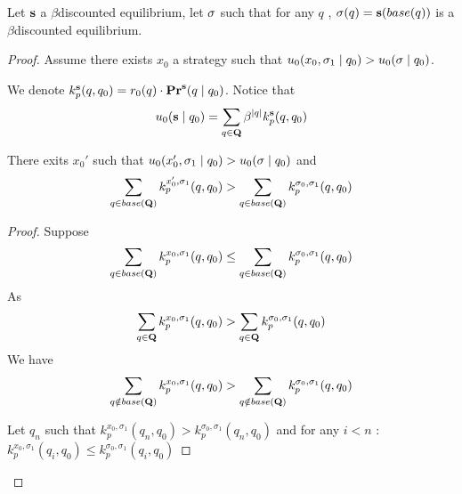 \begin{myprop}
	Let $\mathbf{s}$ a $\beta $discounted  equilibrium, let $\mathbf{\sigma}$ such that for any $q$ , $\mathbf{\sigma}(q) = \mathbf{s}(base(q))$ is a $\beta $discounted  equilibrium.
\end{myprop}
\begin{proof}
	
	Assume there exists $x_0$ a strategy such that $u_0(x_0,\sigma_1 \mid q_0) > u_0(\mathbf{\sigma} \mid q_0)$.
	
	We denote $k^{\mathbf{s}}_p(q,q_0) = r_0(q)\cdot \mathbf{Pr}^{\mathbf{s}}(q \mid q_0)$.
	Notice that $$u_0(\mathbf{s} \mid q_0) = \sum_{q \in \mathbf{Q}} \beta^{|q|} k^{\mathbf{s}}_p(q,q_0)$$
	
	\begin{mylem}
		\label{newx}
		There exits $x_0'$ such that $u_0(x_0',\sigma_1 \mid q_0) > u_0(\mathbf{\sigma} \mid q_0)$ and $$\sum_{q \in base(\mathbf{Q})} k^{x_0',\sigma_1}_p(q,q_0) >  \sum_{q \in base(\mathbf{Q})} k^{\sigma_0,\sigma_1}_p(q,q_0) $$
	\end{mylem}
	\begin{proof}
	Suppose $$\sum_{q \in base(\mathbf{Q})} k^{x_0,\sigma_1}_p(q,q_0) \leq  \sum_{q \in base(\mathbf{Q})} k^{\sigma_0,\sigma_1}_p(q,q_0) $$
	As $$\sum_{q \in\mathbf{Q}} k^{x_0,\sigma_1}_p(q,q_0) >  \sum_{q \in \mathbf{Q}} k^{\sigma_0,\sigma_1}_p(q,q_0) $$
	We have $$\sum_{q \notin base(\mathbf{Q})} k^{x_0,\sigma_1}_p(q,q_0) >  \sum_{q \notin base(\mathbf{Q})} k^{\sigma_0,\sigma_1}_p(q,q_0) $$
	
	
	
	Let $q_n$ such that $k^{x_0,\sigma_1}_p(q_n,q_0) > k^{\sigma_0,\sigma_1}_p(q_n,q_0)$ and for any $i < n$ :  $k^{x_0,\sigma_1}_p(q_{i},q_0) \leq k^{\sigma_0,\sigma_1}_p(q_{i},q_0)$
	
	
	

\end{proof}
\end{proof}
